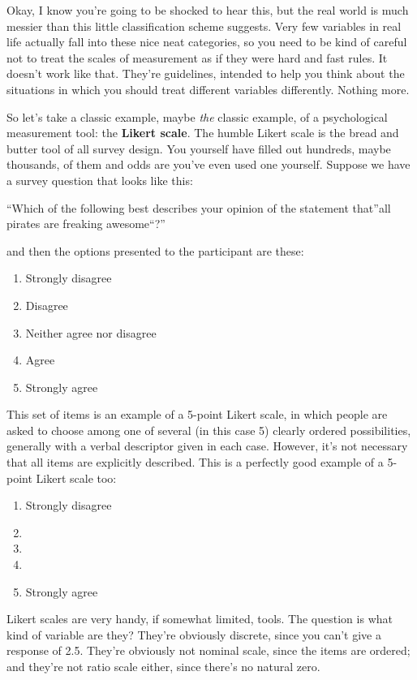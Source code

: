\documentclass[
]{book}
\providecommand{\tightlist}{%
  \setlength{\itemsep}{0pt}\setlength{\parskip}{0pt}}
\begin{document}
Okay, I know you're going to be shocked to hear this, but the real world is much messier than this little classification scheme suggests. Very few variables in real life actually fall into these nice neat categories, so you need to be kind of careful not to treat the scales of measurement as if they were hard and fast rules. It doesn't work like that. They're guidelines, intended to help you think about the situations in which you should treat different variables differently. Nothing more.

So let's take a classic example, maybe \emph{the} classic example, of a psychological measurement tool: the {\textbf{Likert scale}}. The humble Likert scale is the bread and butter tool of all survey design. You yourself have filled out hundreds, maybe thousands, of them and odds are you've even used one yourself. Suppose we have a survey question that looks like this:

``Which of the following best describes your opinion of the statement that''all pirates are freaking awesome``?''

\hfill\break
and then the options presented to the participant are these:

\begin{enumerate}
\def\labelenumi{(\arabic{enumi})}
\tightlist
\item
  Strongly disagree
\item
  Disagree
\item
  Neither agree nor disagree
\item
  Agree
\item
  Strongly agree
\end{enumerate}

This set of items is an example of a 5-point Likert scale, in which people are asked to choose among one of several (in this case 5) clearly ordered possibilities, generally with a verbal descriptor given in each case. However, it's not necessary that all items are explicitly described. This is a perfectly good example of a 5-point Likert scale too:

\begin{enumerate}
\def\labelenumi{(\arabic{enumi})}
\tightlist
\item
  Strongly disagree
\item
\item
\item
\item
  Strongly agree
\end{enumerate}

Likert scales are very handy, if somewhat limited, tools. The question is what kind of variable are they? They're obviously discrete, since you can't give a response of 2.5. They're obviously not nominal scale, since the items are ordered; and they're not ratio scale either, since there's no natural zero.
\end{document}
